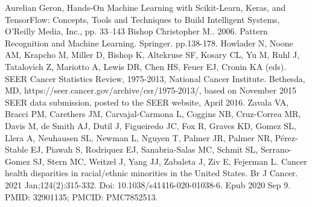 \documentclass[conference]{IEEEtran}
\begin{document}
\begin{thebibliography}{10}
Aurelian Geron, Hands-On Machine Learning with Scikit-Learn, Keras, and TensorFlow: Concepts, Tools and Techniques to Build Intelligent Systems, O'Reilly Media, Inc., pp. 33–143
Bishop Christopher M.. 2006. Pattern Recognition and Machine Learning. Springer.  pp.138-178.
Howlader N, Noone AM, Krapcho M, Miller D, Bishop K, Altekruse SF, Kosary CL, Yu M, Ruhl J, Tatalovich Z, Mariotto A, Lewis DR, Chen HS, Feuer EJ, Cronin KA (eds). SEER Cancer Statistics Review, 1975-2013, National Cancer Institute. Bethesda, MD, https://seer.cancer.gov/archive/csr/1975-2013/, based on November 2015 SEER data submission, posted to the SEER website, April 2016.
Zavala VA, Bracci PM, Carethers JM, Carvajal-Carmona L, Coggins NB, Cruz-Correa MR, Davis M, de Smith AJ, Dutil J, Figueiredo JC, Fox R, Graves KD, Gomez SL, Llera A, Neuhausen SL, Newman L, Nguyen T, Palmer JR, Palmer NR, Pérez-Stable EJ, Piawah S, Rodriquez EJ, Sanabria-Salas MC, Schmit SL, Serrano-Gomez SJ, Stern MC, Weitzel J, Yang JJ, Zabaleta J, Ziv E, Fejerman L. Cancer health disparities in racial/ethnic minorities in the United States. Br J Cancer. 2021 Jan;124(2):315-332. Doi: 10.1038/s41416-020-01038-6. Epub 2020 Sep 9. PMID: 32901135; PMCID: PMC7852513.

\end{thebibliography}

\vspace{12pt}
\end{document}
